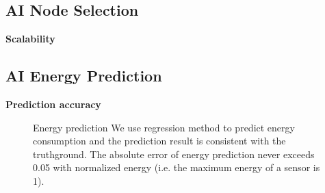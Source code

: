 \subsection{AI Node Selection}
\textbf{Scalability}

\subsection{AI Energy Prediction}
\textbf{Prediction accuracy}

\begin{figure}[htbp]
	\hspace{-0.3cm}
	\centering
	\hspace{0.3cm}
	\vspace{-0.1in}
	\caption{Energy prediction
		\textnormal{
			We use regression method to predict energy consumption and the
			prediction result is consistent with the truthground.  The absolute
			error of energy prediction never exceeds 0.05 with normalized energy
			(i.e. the maximum energy of a sensor is 1).
		}
	}
	\label{energy_pred}
	\vspace{-0.1in}
\end{figure}

